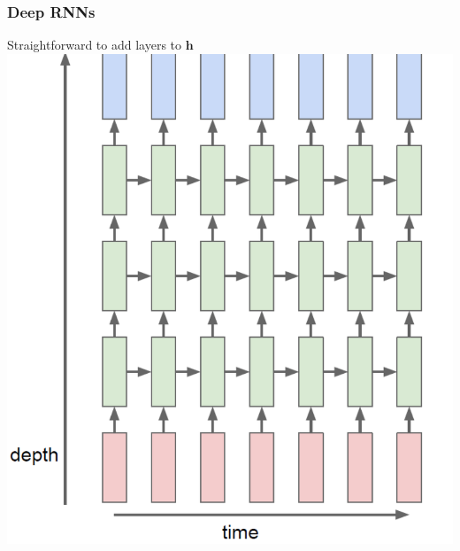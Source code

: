 \documentclass[xcolor=dvipsnames]{beamer}
\begin{document}
\begin{frame}
  \frametitle{Deep RNNs}
  \bi
\item Straightforward to add layers to $\mathbf{h}$
\includegraphics[width=.5\textwidth]{ak-deep-rnn}\raisebox{1em}{[A. Karpathy]}
\ei
\end{frame}
\end{document}

